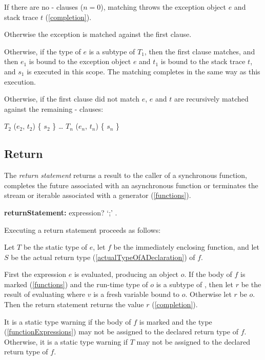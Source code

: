 \documentclass{article}
\begin{document}
\LMHash{}
If there are no \ON{}-\CATCH{} clauses ($n = 0$), matching throws the exception object $e$ and stack trace $t$ (\ref{completion}).

\LMHash{}
Otherwise the exception is matched against the first clause.

\LMHash{}
Otherwise, if the type of $e$ is a subtype of $T_1$, then the first clause matches, and then $e_1$ is bound to the exception object $e$ and $t_1$ is bound to the stack trace $t$, and $s_1$ is executed in this scope.
The matching completes in the same way as this execution.

\LMHash{}
Otherwise, if the first clause did not match $e$, $e$ and $t$ are recursively matched against the remaining \ON{}-\CATCH{} clauses:
\begin{dartCode}
\ON{} $T_2$ \CATCH{} ($e_2$, $t_2$) \{ $s_2$ \}
\ldots
\ON{} $T_n$ \CATCH{} ($e_n$, $t_n$) \{ $s_n$ \}
\end{dartCode}


\subsection{Return}

\LMHash{}
The {\em return statement} returns a result to the caller of a synchronous function, completes the future associated with an asynchronous function or terminates the stream or iterable associated with a generator (\ref{functions}).

\begin{grammar}
{\bf returnStatement:}\RETURN{} expression? `{\escapegrammar ;}'
  .
\end{grammar}

\LMHash{}
Executing a return statement  proceeds as follows:

\LMHash{}
Let $T$ be the static type of $e$, let $f$ be the immediately enclosing function, and let $S$ be the actual return type (\ref{actualTypeOfADeclaration}) of $f$.

\LMHash{}
First the expression $e$ is evaluated, producing an object $o$.
If the body of $f$ is marked \ASYNC{} (\ref{functions}) and the run-time type of $o$ is a subtype of , then let $r$ be the result of evaluating  where $v$ is a fresh variable bound to $o$. Otherwise let $r$ be $o$.
Then the return statement returns the value $r$ (\ref{completion}).

\LMHash{}
It is a static type warning if the body of $f$ is marked \ASYNC{} and the type  (\ref{functionExpressions}) may not be assigned to the declared return type of $f$.
Otherwise, it is a static type warning if $T$ may not be assigned to the declared return type of $f$.
\end{document}

